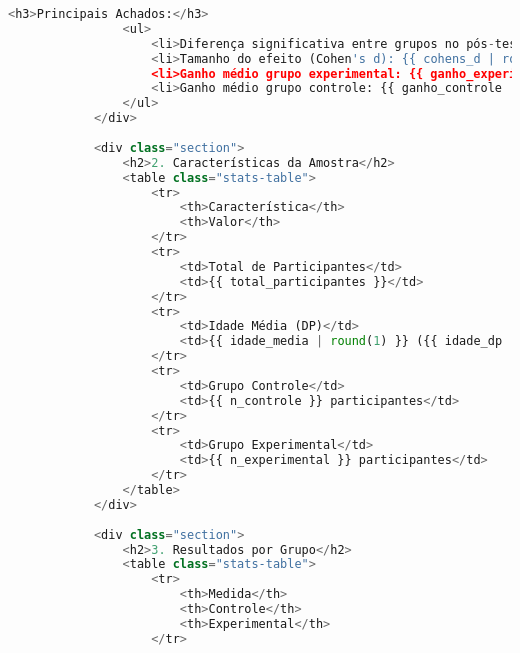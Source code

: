 \begin{pythonbox}
\begin{lstlisting}[language=Python]                       
                <h3>Principais Achados:</h3>
                <ul>
                    <li>Diferença significativa entre grupos no pós-teste: <span class="{{ 'significant' if teste_significativo else '' }}">{{ 'SIM' if teste_significativo else 'NÃO' }} (p = {{ p_valor | round(4) }})</span></li>
                    <li>Tamanho do efeito (Cohen's d): {{ cohens_d | round(3) }}</li>
                    <li>Ganho médio grupo experimental: {{ ganho_experimental | round(2) }} pontos</li>
                    <li>Ganho médio grupo controle: {{ ganho_controle | round(2) }} pontos</li>
                </ul>
            </div>
            
            <div class="section">
                <h2>2. Características da Amostra</h2>
                <table class="stats-table">
                    <tr>
                        <th>Característica</th>
                        <th>Valor</th>
                    </tr>
                    <tr>
                        <td>Total de Participantes</td>
                        <td>{{ total_participantes }}</td>
                    </tr>
                    <tr>
                        <td>Idade Média (DP)</td>
                        <td>{{ idade_media | round(1) }} ({{ idade_dp | round(1) }})</td>
                    </tr>
                    <tr>
                        <td>Grupo Controle</td>
                        <td>{{ n_controle }} participantes</td>
                    </tr>
                    <tr>
                        <td>Grupo Experimental</td>
                        <td>{{ n_experimental }} participantes</td>
                    </tr>
                </table>
            </div>
            
            <div class="section">
                <h2>3. Resultados por Grupo</h2>
                <table class="stats-table">
                    <tr>
                        <th>Medida</th>
                        <th>Controle</th>
                        <th>Experimental</th>
                    </tr>
   \end{lstlisting}
\end{pythonbox}

